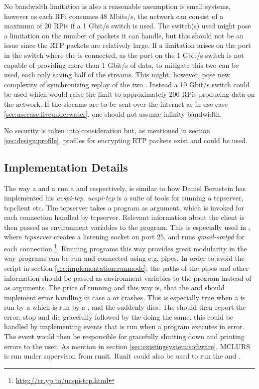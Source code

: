\noindent{}No bandwidth limitation is also a reasonable assumption is small systems, however as each RPi consumes 48 Mbits/s, the network can consist of a maximum of 20 RPis if a 1 Gbit/s switch is used. The switch(s) used might pose a limitation on the number of packets it can handle, but this should not be an issue since the RTP packets are relatively large.  If a limitation arises on the port in the switch where the \hist{} is connected, as the port on the 1 Gbit/s switch is not capable of providing more than 1 Gbit/s of data, to mitigate this two  can be used, each only saving half of the streams. This might, however, pose new complexity of synchronizing replay of the two . Instead a 10 Gbit/s switch could be used which would raise the limit to approximately 200 RPis producing data on the network. If the streams are to be sent over the internet as in use case \ref{sec:usecase:liveunderwater}, one should not assume infinity bandwidth.

\noindent{}No security is taken into consideration but, as mentioned in section \ref{sec:design:profile}, profiles for encrypting RTP packets exist and could be used.

\subsection{Implementation Details}

The way a \pub{} and a \sub{} run a \pro{} and \con{} respectively, is similar to how Daniel Bernstein has implemented his \textit{ucspi-tcp}. \textit{ucspi-tcp} is a suite of tools for running a tcpserver, tcpclient etc. The tcpserver takes a program as argument, which is invoked for each connection handled by tcpserver. Relevant information about the client is then passed as environment variables to the program. This is especially used in  , where \textit{tcpserver} creates a listening socket on port 25, and runs \textit{qmail-smtpd} for each connection.\footnote{\url{http://cr.yp.to/ucspi-tcp.html}}. Running programs this way provides great modularity in the way programs can be run and connected using e.g. pipes. In order to avoid the  script in section \ref{sec:implementation:runmode}, the paths of the pipes and other information should be passed as environment variables to the program instead of as arguments. The price of running \pros{} and \cons{} this way is, that the \sub{} and \pub{} should implement error handling in case a \con{} or \pro{} crashes. This is especially true when a  is run by a \pub{} which is run by a \sub{}, and the  suddenly dies. The \pub{} should then report the error, stop and die gracefully followed by the \sub{} doing the same. this could be handled by implementing events that is run when a program executes in error. The event would then be responsible for gracefully shutting down and printing errors to the user. As mention in section \ref{sec:existingsystem:software}, MCLURS is run under supervison from runit. Runit could also be used to run the \sub{} and \pub{}. 


